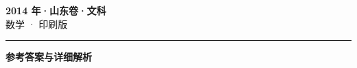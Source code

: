 \documentclass[zihao=5, a4paper]{ctexart}
\begin{document}
\begin{center}
  {\Large\bfseries 2014 年·山东卷·文科}\\[4pt]
  {\large 数学 · 印刷版}
\end{center}
\medskip
{}

\par\bigskip\hrule\bigskip
{}
\Needspace{0.55\textheight}
\begin{center}{\large\bfseries 参考答案与详细解析}\end{center}
\smallskip

\end{document}
